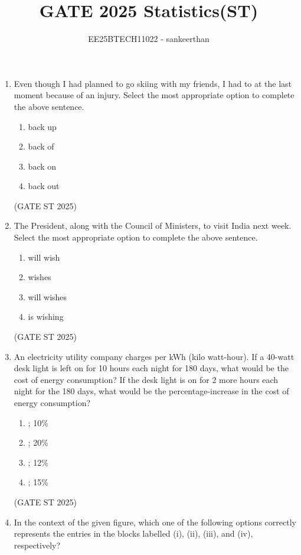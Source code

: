 \documentclass[journal,12pt,onecolumn]{IEEEtran}
\title{\textbf{GATE 2025 Statistics(ST)}}
\author{EE25BTECH11022 - sankeerthan}
\date{}
\theoremstyle{remark}
\begin{document}
\maketitle

\begin{enumerate}

\item Even though I had planned to go skiing with my friends, I had to \underline{\phantom{imagine}} at the last moment because of an injury.
Select the most appropriate option to complete the above sentence. \begin{enumerate}
\item back up
\item back of
\item back on
\item back out
\end{enumerate}
\hfill{(GATE ST 2025)}
\item The President, along with the Council of Ministers, \underline{\phantom{imagine}} to visit India next week.
Select the most appropriate option to complete the above sentence.
\begin{enumerate}
\item will wish
\item wishes
\item will wishes
\item is wishing
\end{enumerate}
\hfill{(GATE ST 2025)}
\item
An electricity utility company charges  per kWh (kilo watt-hour). If a 40-watt desk light is left on for 10 hours each night for 180 days, what would be the cost of energy consumption? If the desk light is on for 2 more hours each night for the 180 days, what would be the percentage-increase in the cost of energy consumption?

\begin{enumerate}
\item {}; 10\%
\item {}; 20\%
\item {}; 12\%
\item {}; 15\%
\end{enumerate}
\hfill{(GATE ST 2025)}
\item In the context of the given figure, which one of the following options correctly represents the entries in the blocks labelled (i), (ii), (iii), and (iv), respectively?


\end{enumerate}
\end{document}
